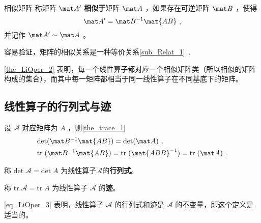 \begin{definition}{相似矩阵}
称矩阵 $\mat A'$ \textbf{相似于}矩阵 $\mat A$ ，如果存在可逆矩阵 $\mat B$ ，使得
\begin{equation}
\mat A'=\mat B^{-1}\mat{AB}~,
\end{equation}
并记作 $\mat A'\sim \mat A$ 。
\end{definition}
容易验证，矩阵的相似关系是一种等价关系\autoref{sub_Relat_1}~.

\autoref{the_LiOper_2} 表明，每一个线性算子都对应一个相似矩阵类（所以相似的矩阵构成的集合），而其中每一矩阵都相当于同一线性算子在不同基底下的矩阵。
\subsection{线性算子的行列式与迹}\label{sub_LiOper_2}
设 $\mathcal{A}$ 对应矩阵为 $A$ ，则\autoref{the_trace_1}~ 
\begin{equation}\label{eq_LiOper_3}
\begin{aligned}
&\mathrm{det}(\mat B^{-1}\mat{AB})=\mathrm{det}(\mat A)~,\\
&\mathrm{tr}\;(\mat B^{-1}\mat{AB})=\mathrm{tr}\;(\mat{ABB}^{-1})=\mathrm{tr}\;(\mat A)~.
\end{aligned}
\end{equation}
\begin{definition}{}
称
$
\mathrm{det}\;\mathcal{A}=\mathrm{det}\;A
$
为线性算子$\mathcal{A}$的\textbf{行列式}。

称
$
\mathrm{tr}\;\mathcal{A}=\mathrm{tr}\;A
$
为线性算子 $\mathcal{A}$ 的\textbf{迹}。
\end{definition}
\autoref{eq_LiOper_3} 表明，线性算子 $\mathcal{A}$ 的行列式和迹是 $\mathcal{A}$ 的不变量，即这个定义是适当的。


